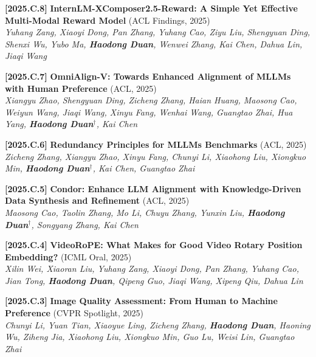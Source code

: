 \documentclass{resume}
\newcommand{\itemgap}{\vspace{-1mm}}%
\begin{document}
\itemgap

\textbf{[2025.C.8]} \textbf{InternLM-XComposer2.5-Reward: A Simple Yet Effective Multi-Modal Reward Model} (ACL Findings, 2025) \\
\textit{Yuhang Zang, Xiaoyi Dong, Pan Zhang, Yuhang Cao, Ziyu Liu, Shengyuan Ding, Shenxi Wu, Yubo Ma, \textbf{Haodong Duan}, Wenwei Zhang, Kai Chen, Dahua Lin, Jiaqi Wang} \\

\itemgap

\textbf{[2025.C.7]} \textbf{OmniAlign-V: Towards Enhanced Alignment of MLLMs with Human Preference} (ACL, 2025) \\
\textit{Xiangyu Zhao, Shengyuan Ding, Zicheng Zhang, Haian Huang, Maosong Cao, Weiyun Wang, Jiaqi Wang, Xinyu Fang, Wenhai Wang, Guangtao Zhai, Hua Yang, \textbf{Haodong Duan$^\dag$}, Kai Chen} \\

\itemgap

\textbf{[2025.C.6]} \textbf{Redundancy Principles for MLLMs Benchmarks} (ACL, 2025) \\
\textit{Zicheng Zhang, Xiangyu Zhao, Xinyu Fang, Chunyi Li, Xiaohong Liu, Xiongkuo Min, \textbf{Haodong Duan$^\dag$}, Kai Chen, Guangtao Zhai} \\

\itemgap

\textbf{[2025.C.5]} \textbf{Condor: Enhance LLM Alignment with Knowledge-Driven Data Synthesis and Refinement} (ACL, 2025) \\
\textit{Maosong Cao, Taolin Zhang, Mo Li, Chuyu Zhang, Yunxin Liu, \textbf{Haodong Duan$^\dag$}, Songyang Zhang, Kai Chen} \\

\itemgap

\textbf{[2025.C.4]} \textbf{VideoRoPE: What Makes for Good Video Rotary Position Embedding?} (ICML Oral, 2025) \\
\textit{Xilin Wei, Xiaoran Liu, Yuhang Zang, Xiaoyi Dong, Pan Zhang, Yuhang Cao, Jian Tong, \textbf{Haodong Duan}, Qipeng Guo, Jiaqi Wang, Xipeng Qiu, Dahua Lin} \\

\itemgap

\textbf{[2025.C.3]} \textbf{Image Quality Assessment: From Human to Machine Preference} (CVPR Spotlight, 2025) \\
\textit{Chunyi Li, Yuan Tian, Xiaoyue Ling, Zicheng Zhang, \textbf{Haodong Duan}, Haoning Wu, Ziheng Jia, Xiaohong Liu, Xiongkuo Min, Guo Lu, Weisi Lin, Guangtao Zhai} \\
\end{document}

